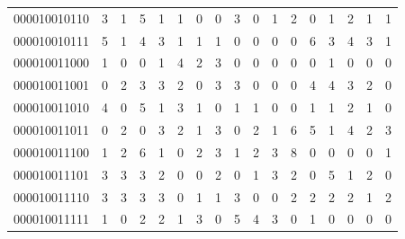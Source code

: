 \documentclass[10pt,a4paper]{article}
\begin{document}
\begin{longtable}{ |c|c|c|c|c|c|c|c|c|c|c|c|c|c|c|c|c| }
    000010010110              & 3                            & 1                                & 5                            & 1                              & 1   & 0   & 0   & 3   & 0   & 1   & 2   & 0   & 1   & 2   & 1   & 1   \\
    000010010111              & 5                            & 1                                & 4                            & 3                              & 1   & 1   & 1   & 0   & 0   & 0   & 0   & 6   & 3   & 4   & 3   & 1   \\
    000010011000              & 1                            & 0                                & 0                            & 1                              & 4   & 2   & 3   & 0   & 0   & 0   & 0   & 0   & 1   & 0   & 0   & 0   \\
    000010011001              & 0                            & 2                                & 3                            & 3                              & 2   & 0   & 3   & 3   & 0   & 0   & 0   & 4   & 4   & 3   & 2   & 0   \\
    000010011010              & 4                            & 0                                & 5                            & 1                              & 3   & 1   & 0   & 1   & 1   & 0   & 0   & 1   & 1   & 2   & 1   & 0   \\
    000010011011              & 0                            & 2                                & 0                            & 3                              & 2   & 1   & 3   & 0   & 2   & 1   & 6   & 5   & 1   & 4   & 2   & 3   \\
    000010011100              & 1                            & 2                                & 6                            & 1                              & 0   & 2   & 3   & 1   & 2   & 3   & 8   & 0   & 0   & 0   & 0   & 1   \\
    000010011101              & 3                            & 3                                & 3                            & 2                              & 0   & 0   & 2   & 0   & 1   & 3   & 2   & 0   & 5   & 1   & 2   & 0   \\
    000010011110              & 3                            & 3                                & 3                            & 3                              & 0   & 1   & 1   & 3   & 0   & 0   & 2   & 2   & 2   & 2   & 1   & 2   \\
    000010011111              & 1                            & 0                                & 2                            & 2                              & 1   & 3   & 0   & 5   & 4   & 3   & 0   & 1   & 0   & 0   & 0   & 0   \\

\end{longtable}
\end{document}
